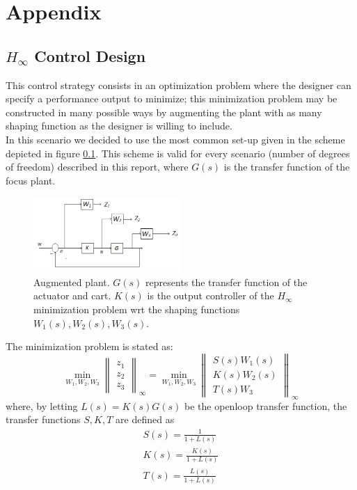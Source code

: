 \chapter*{Appendix}

\section{$H_\infty$ Control Design} \label{app:hinf}
This control strategy consists in an optimization problem where the designer can specify a performance output to minimize; this minimization problem may be constructed in many possible ways by augmenting the plant with as many shaping function as the designer is willing to include.\\

In this scenario we decided to use the most common set-up given in the scheme depicted in figure \ref{fig:hinfscheme}. This scheme is valid for every scenario (number of degrees of freedom) described in this report, where $G(s)$ is the transfer function of the focus plant.\\

\begin{figure}[h]
	\centering
	\includegraphics[width=0.5\textwidth]{img/hinf_scheme.png}
	\caption{Augmented plant. $G(s)$ represents the transfer function of the actuator and cart. $K(s)$ is the output controller of the $H_\infty$ minimization problem wrt the shaping functions $W_1(s), W_2(s), W_3(s)$.}
	\label{fig:hinfscheme}
\end{figure}

The minimization problem is stated as:
\begin{equation}
	\min_{W_1, W_2, W_3} 
		\begin{Vmatrix}
			z_1 \\ z_2 \\ z_3
		\end{Vmatrix}_\infty
	=
	\min_{W_1, W_2, W_3} 
		\begin{Vmatrix}
			S(s) W_1(s) \\ K(s) W_2(s) \\ T(s) W_3
		\end{Vmatrix}_\infty
\end{equation}
where, by letting $L(s) = K(s)G(s)$ be the openloop transfer function, the transfer functions $S, K, T$ are defined as
\begin{gather}
	S(s) = \frac{1}{1+L(s)} \\
	K(s)=\frac{K(s)}{1+L(s)} \\
	T(s)=\frac{L(s)}{1+L(s)}
\end{gather} 


